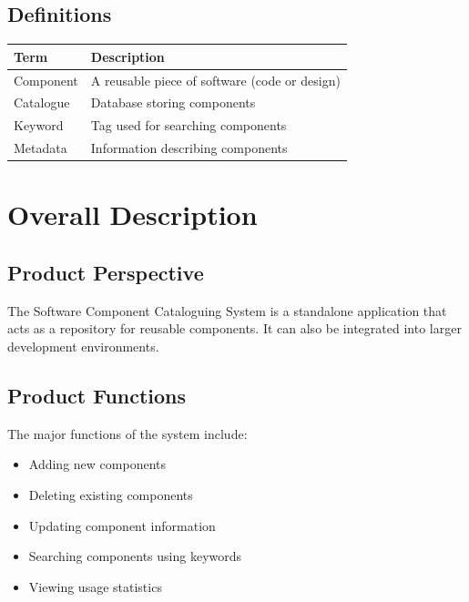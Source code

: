 \documentclass[12pt]{scrreprt}
\begin{document}
\vfill{}
\section{Definitions}
\begin{longtable}{|p{4cm}|p{10cm}|}
\hline
\textbf{Term} & \textbf{Description} \\
\hline
Component & A reusable piece of software (code or design) \\
Catalogue & Database storing components \\
Keyword & Tag used for searching components \\
Metadata & Information describing components \\
\hline
\end{longtable}

\chapter{Overall Description}

\section{Product Perspective}
The Software Component Cataloguing System is a standalone application that acts as a repository for reusable components. It can also be integrated into larger development environments.

\section{Product Functions}
The major functions of the system include:
\begin{itemize}
    \item Adding new components
    \item Deleting existing components
    \item Updating component information
    \item Searching components using keywords
    \item Viewing usage statistics
\end{itemize}
\end{document}
